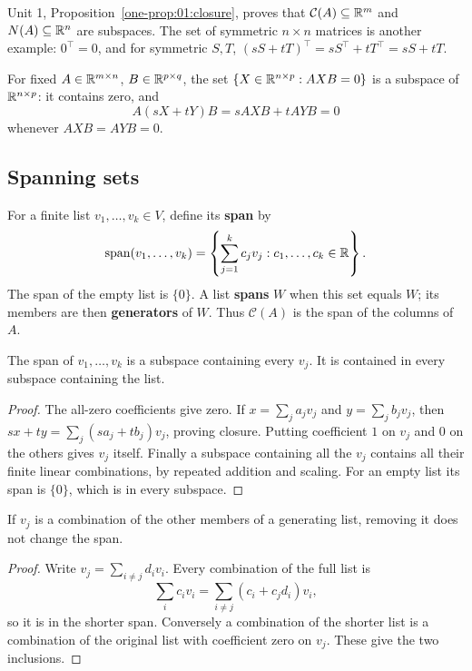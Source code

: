 Unit 1, Proposition~\ref{one-prop:01:closure}, proves that
\(\mathcal C(A)\subseteq\mathbb R^m\) and \(N(A)\subseteq\mathbb R^n\) are subspaces.
The set of symmetric \(n\times n\) matrices is another example:
\(0^\top=0\), and for symmetric \(S,T\),
\((sS+tT)^\top=sS^\top+tT^\top=sS+tT\).

For fixed \(A\in\mathbb R^{m\times n}\), \(B\in\mathbb R^{p\times q}\),
the set \(\{X\in\mathbb R^{n\times p}:AXB=0\}\) is a subspace of
\(\mathbb R^{n\times p}\): it contains zero, and
\[
A(sX+tY)B=sAXB+tAYB=0
\]
whenever \(AXB=AYB=0\).

\subsection*{Spanning sets}
For a finite list \(v_1,\ldots,v_k\in V\), define its \textbf{span} by
\[
\operatorname{span}(v_1,\ldots,v_k)
=\left\{\sum_{j=1}^k c_jv_j:c_1,\ldots,c_k\in\mathbb R\right\}.
\]
The span of the empty list is \(\{0\}\). A list \textbf{spans} \(W\)
when this set equals \(W\); its members are then \textbf{generators}
of \(W\). Thus \(\mathcal C(A)\) is the span of the columns of \(A\).

\begin{proposition}\label{prop:02:span}
The span of \(v_1,\ldots,v_k\) is a subspace containing every \(v_j\).
It is contained in every subspace containing the list.
\end{proposition}
\begin{proof}
The all-zero coefficients give zero. If \(x=\sum_j a_jv_j\) and
\(y=\sum_j b_jv_j\), then
\(sx+ty=\sum_j(sa_j+tb_j)v_j\), proving closure.
Putting coefficient \(1\) on \(v_j\) and \(0\) on the others gives
\(v_j\) itself. Finally a subspace containing all the \(v_j\) contains
all their finite linear combinations, by repeated addition and scaling.
For an empty list its span is \(\{0\}\), which is in every subspace.
\end{proof}

\begin{proposition}\label{prop:02:redundancy}
If \(v_j\) is a combination of the other members of a generating list,
removing it does not change the span.
\end{proposition}
\begin{proof}
Write \(v_j=\sum_{i\ne j}d_iv_i\). Every combination of the full list is
\[
\sum_i c_iv_i=\sum_{i\ne j}(c_i+c_jd_i)v_i,
\]
so it is in the shorter span. Conversely a combination of the shorter
list is a combination of the original list with coefficient zero on
\(v_j\). These give the two inclusions.
\end{proof}


